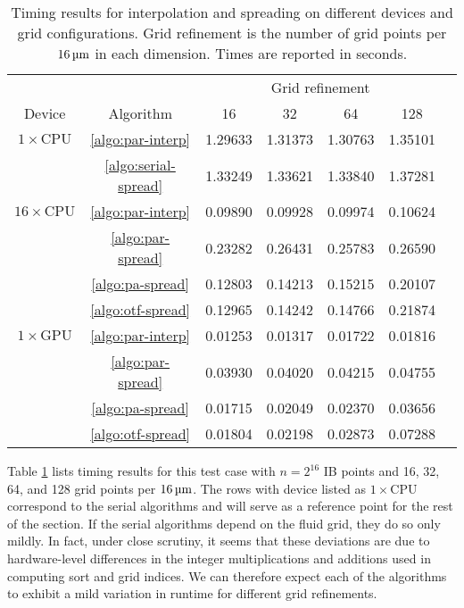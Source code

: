 \begin{table}
    \begin{center}
    \bgroup
    \renewcommand{\arraystretch}{1.7}
    \begin{tabular}{ccccccc}
                                                                                              \toprule
                             &                          & \multicolumn{4}{c}{Grid refinement}   \\ \cline{3-6}
        Device               & Algorithm                & 16      & 32      & 64      & 128     \\ \midrule
        $1\times\text{CPU}$  & \ref{algo:par-interp}    & 1.29633 & 1.31373 & 1.30763 & 1.35101 \\
                             & \ref{algo:serial-spread} & 1.33249 & 1.33621 & 1.33840 & 1.37281 \\ \midrule
        $16\times\text{CPU}$ & \ref{algo:par-interp}    & 0.09890 & 0.09928 & 0.09974 & 0.10624 \\
                             & \ref{algo:par-spread}    & 0.23282 & 0.26431 & 0.25783 & 0.26590 \\
                             & \ref{algo:pa-spread}     & 0.12803 & 0.14213 & 0.15215 & 0.20107 \\
                             & \ref{algo:otf-spread}    & 0.12965 & 0.14242 & 0.14766 & 0.21874 \\ \midrule
        $1\times\text{GPU}$  & \ref{algo:par-interp}    & 0.01253 & 0.01317 & 0.01722 & 0.01816 \\
                             & \ref{algo:par-spread}    & 0.03930 & 0.04020 & 0.04215 & 0.04755 \\
                             & \ref{algo:pa-spread}     & 0.01715 & 0.02049 & 0.02370 & 0.03656 \\
                             & \ref{algo:otf-spread}    & 0.01804 & 0.02198 & 0.02873 & 0.07288 \\ \bottomrule
    \end{tabular}
    \egroup
    \end{center}
    \caption{%
        Timing results for interpolation and spreading on different devices and
        grid configurations. Grid refinement is the number of grid points per
        $16\um$ in each dimension. Times are reported in seconds.
    }
    \label{tab:grid-timing}
\end{table}

Table \ref{tab:grid-timing} lists timing results for this test case with
$n=2^{16}$ IB points and 16, 32, 64, and 128 grid points per $16\um$.
The rows with device listed as $1\times\text{CPU}$ correspond to the serial
algorithms and will serve as a reference point for the rest of the section. If
the serial algorithms depend on the fluid grid, they do so only mildly. In
fact, under close scrutiny, it seems that these deviations are due to
hardware-level differences in the integer multiplications and additions used in
computing sort and grid indices. We can therefore expect each of the algorithms
to exhibit a mild variation in runtime for different grid refinements.

